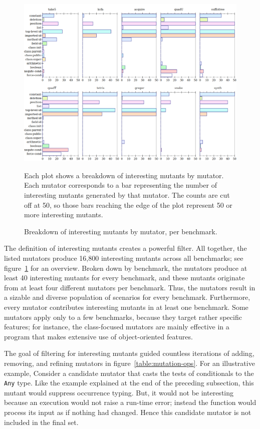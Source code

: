\begin{figure}
 \centering
 \includegraphics[scale=0.33]{./plots/mutant-breakdown}

 \vspace{1em}

 \begin{minipage}{\textwidth}
 Each plot shows a breakdown of interesting mutants by mutator.
 Each mutator corresponds to a bar representing the number of interesting mutants generated by that mutator.
 The counts are cut off at 50, so those bars reaching the edge of the plot represent 50 or more interesting mutants.
 \end{minipage}

\caption{Breakdown of interesting mutants by mutator, per benchmark.}
 \label{fig:mutant-breakdown}
\end{figure}

The definition of interesting mutants creates a powerful filter. All
together, the listed mutators produce 16,800 interesting mutants across all benchmarks; see
figure~\ref{fig:mutant-breakdown} for an overview. Broken down by benchmark, the
mutators produce at least 40 interesting mutants for every benchmark, and
these mutants originate from at least four different mutators per benchmark.
Thus, the mutators result in a sizable and diverse population of scenarios for
every benchmark.  Furthermore, every mutator contributes interesting mutants in at least
one benchmark.  Some mutators apply only to a few benchmarks, because they
target rather specific features; for instance, the class-focused mutators are
mainly effective in a program that makes extensive use of object-oriented
features.

The goal of filtering for interesting mutants guided countless iterations of
adding, removing, and refining mutators in figure~\ref{table:mutation-ops}.  For
an illustrative example, Consider a candidate mutator that casts the tests of
conditionals to the {\tt Any} type. Like the example explained at the end of the
preceding subsection, this mutant would suppress occurrence typing. But, it
would not be interesting because an execution would not raise a run-time error;
instead the function would process its input as if nothing had changed. Hence
this candidate mutator is not included in the final set.

